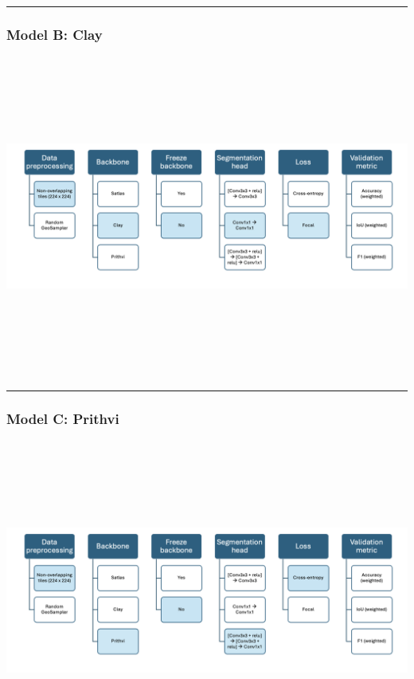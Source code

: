 \documentclass[
  letterpaper,
  DIV=11,
  numbers=noendperiod]{scrartcl}
\begin{document}
\begin{center}\rule{0.5\linewidth}{0.5pt}\end{center}

\subsubsection{Model B: Clay}\label{model-b-clay}

\begin{center}
\includegraphics[width=\textwidth,height=4.16667in]{../figures/algo_design/clay_model.png}
\end{center}

\begin{center}\rule{0.5\linewidth}{0.5pt}\end{center}

\subsubsection{Model C: Prithvi}\label{model-c-prithvi}

\begin{center}
\includegraphics[width=\textwidth,height=4.16667in]{../figures/algo_design/prithvi_model.png}
\end{center}
\end{document}
